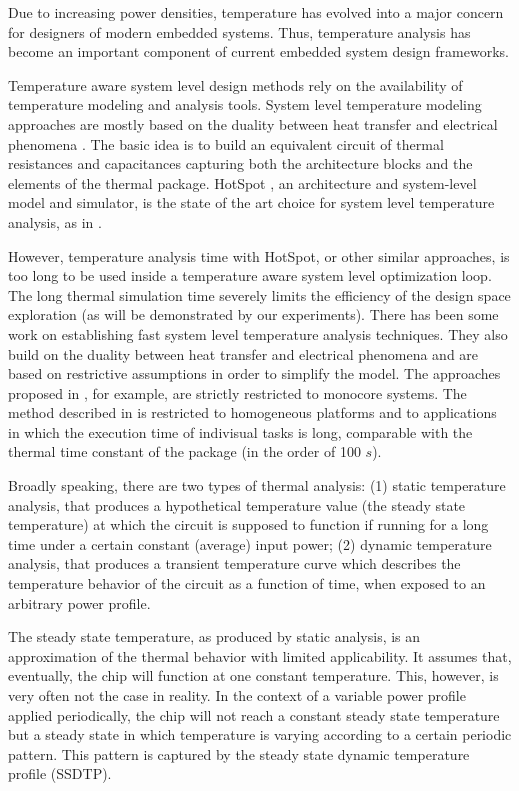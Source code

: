 Due to increasing power densities, temperature has evolved into a major concern for designers of modern embedded systems. Thus, temperature analysis has become an important component of current embedded system design frameworks.

Temperature aware system level design methods rely on the availability of temperature modeling and analysis tools. System level temperature modeling approaches are mostly based on the duality between heat transfer and electrical phenomena \cite{kreith2000}. The basic idea is to build an equivalent circuit of thermal resistances and capacitances capturing both the architecture blocks and the elements of the thermal package. HotSpot \cite{huang2003}, an architecture and system-level model and simulator, is the state of the art choice for system level temperature analysis, as in \cite{srinivasan2004, liao2005, coskun2006, liu2007, huang2009, xiang2010, thiele2011}.

However, temperature analysis time with HotSpot, or other similar approaches, is too long to be used inside a temperature aware system level optimization loop. The long thermal simulation time severely limits the efficiency of the design space exploration (as will be demonstrated by our experiments). There has been some work on establishing fast system level temperature analysis techniques. They also build on the duality between heat transfer and electrical phenomena and are based on restrictive assumptions in order to simplify the model. The approaches proposed in \cite{rai2011, bao2010}, for example, are strictly restricted to monocore systems. The method described in \cite{rao2009} is restricted to homogeneous platforms and to applications in which the execution time of indivisual tasks is long, comparable with the thermal time constant of the package (in the order of 100 $s$).

Broadly speaking, there are two types of thermal analysis: (1) static temperature analysis, that produces a hypothetical temperature value (the steady state temperature) at which the circuit is supposed to function if running for a long time under a certain constant (average) input power; (2) dynamic temperature analysis, that produces a transient temperature curve which describes the temperature behavior of the circuit as a function of time, when exposed to an arbitrary power profile.

The steady state temperature, as produced by static analysis, is an approximation of the thermal behavior with limited applicability. It assumes that, eventually, the chip will function at one constant temperature.  This, however, is very often not the case in reality. In the context of a variable power profile applied periodically, the chip will not reach a constant steady state temperature but a steady state in which temperature is varying according to a certain periodic pattern. This pattern is captured by the steady state dynamic temperature profile (SSDTP).

